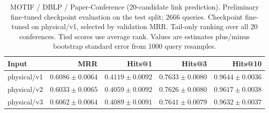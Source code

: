\begin{table}[t]
\centering
\small
\begin{tabular}{lrrrr}
\toprule
Input & MRR & Hits@1 & Hits@3 & Hits@10 \\
\midrule
physical/v1 & $0.6086 \pm 0.0064$ & $0.4119 \pm 0.0092$ & $0.7633 \pm 0.0080$ & $0.9644 \pm 0.0036$ \\
physical/v2 & $0.6033 \pm 0.0065$ & $0.4059 \pm 0.0092$ & $0.7626 \pm 0.0080$ & $0.9617 \pm 0.0038$ \\
physical/v3 & $0.6062 \pm 0.0064$ & $0.4089 \pm 0.0091$ & $0.7641 \pm 0.0079$ & $0.9632 \pm 0.0037$ \\
\bottomrule
\end{tabular}
\caption{MOTIF / DBLP / Paper-Conference (20-candidate link prediction). Preliminary fine-tuned checkpoint evaluation on the test split; 2666 queries. Checkpoint fine-tuned on physical/v1, selected by validation MRR. Tail-only ranking over all 20 conferences. Tied scores use average rank. Values are estimates plus/minus bootstrap standard error from 1000 query resamples.}
\label{tab:motif-paper_conference-link_prediction}
\end{table}
